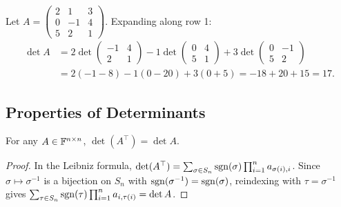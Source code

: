 \documentclass[11pt,a4paper]{article}
\begin{document}
\begin{example}
\label{ex:cofactor_3x3}
Let $A = \begin{pmatrix} 2 & 1 & 3 \\ 0 & -1 & 4 \\ 5 & 2 & 1 \end{pmatrix}$.
Expanding along row 1:
\begin{align*}
  \det A &= 2 \det\begin{pmatrix} -1 & 4 \\ 2 & 1 \end{pmatrix}
          - 1 \det\begin{pmatrix} 0 & 4 \\ 5 & 1 \end{pmatrix}
          + 3 \det\begin{pmatrix} 0 & -1 \\ 5 & 2 \end{pmatrix} \\
         &= 2(-1-8) - 1(0-20) + 3(0+5)
          = -18 + 20 + 15 = 17.
\end{align*}
\end{example}

\subsection{Properties of Determinants}

\begin{proposition}[Transpose]
\label{prop:det_transpose}
For any $A \in \mathbb{F}^{n \times n}$, $\det(A^\top) = \det A$.
\end{proposition}

\begin{proof}
In the Leibniz formula, $\det(A^\top) = \sum_{\sigma \in S_n} \operatorname{sgn}(\sigma)
\prod_{i=1}^n a_{\sigma(i),i}$.  Since $\sigma \mapsto \sigma^{-1}$ is a
bijection on $S_n$ with $\operatorname{sgn}(\sigma^{-1}) = \operatorname{sgn}(\sigma)$, reindexing
with $\tau = \sigma^{-1}$ gives
$\sum_{\tau \in S_n} \operatorname{sgn}(\tau) \prod_{i=1}^n a_{i,\tau(i)} = \det A$.
\end{proof}
\end{document}
